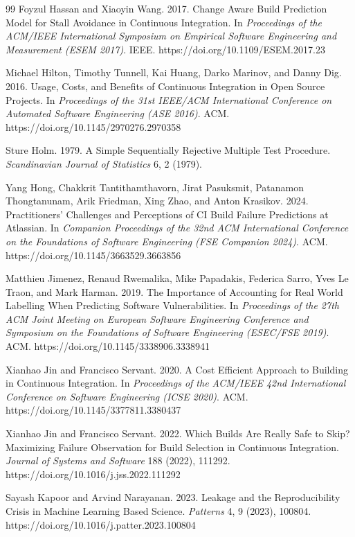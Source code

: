 \documentclass[sigconf,review,anonymous,nonacm]{acmart}
\begin{document}
\begin{thebibliography}{99}
Foyzul Hassan and Xiaoyin Wang. 2017.
Change Aware Build Prediction Model for Stall Avoidance in Continuous Integration.
In \textit{Proceedings of the ACM/IEEE International Symposium on Empirical Software Engineering and Measurement (ESEM 2017)}. IEEE. https://doi.org/10.1109/ESEM.2017.23

Michael Hilton, Timothy Tunnell, Kai Huang, Darko Marinov, and Danny Dig. 2016.
Usage, Costs, and Benefits of Continuous Integration in Open Source Projects.
In \textit{Proceedings of the 31st IEEE/ACM International Conference on Automated Software Engineering (ASE 2016)}. ACM. https://doi.org/10.1145/2970276.2970358

Sture Holm. 1979.
A Simple Sequentially Rejective Multiple Test Procedure.
\textit{Scandinavian Journal of Statistics} 6, 2 (1979).

Yang Hong, Chakkrit Tantithamthavorn, Jirat Pasuksmit, Patanamon Thongtanunam, Arik Friedman, Xing Zhao, and Anton Krasikov. 2024.
Practitioners' Challenges and Perceptions of CI Build Failure Predictions at Atlassian.
In \textit{Companion Proceedings of the 32nd ACM International Conference on the Foundations of Software Engineering (FSE Companion 2024)}. ACM. https://doi.org/10.1145/3663529.3663856

Matthieu Jimenez, Renaud Rwemalika, Mike Papadakis, Federica Sarro, Yves Le Traon, and Mark Harman. 2019.
The Importance of Accounting for Real World Labelling When Predicting Software Vulnerabilities.
In \textit{Proceedings of the 27th ACM Joint Meeting on European Software Engineering Conference and Symposium on the Foundations of Software Engineering (ESEC/FSE 2019)}. ACM. https://doi.org/10.1145/3338906.3338941

Xianhao Jin and Francisco Servant. 2020.
A Cost Efficient Approach to Building in Continuous Integration.
In \textit{Proceedings of the ACM/IEEE 42nd International Conference on Software Engineering (ICSE 2020)}. ACM. https://doi.org/10.1145/3377811.3380437

Xianhao Jin and Francisco Servant. 2022.
Which Builds Are Really Safe to Skip? Maximizing Failure Observation for Build Selection in Continuous Integration.
\textit{Journal of Systems and Software} 188 (2022), 111292. https://doi.org/10.1016/j.jss.2022.111292

Sayash Kapoor and Arvind Narayanan. 2023.
Leakage and the Reproducibility Crisis in Machine Learning Based Science.
\textit{Patterns} 4, 9 (2023), 100804. https://doi.org/10.1016/j.patter.2023.100804


\end{thebibliography}
\end{document}

